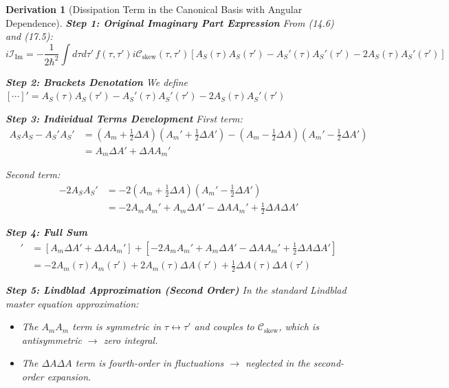 \documentclass[10pt, a4paper]{article}
\newtheorem{derivation}{Derivation}
\begin{document}
\begin{derivation}[Dissipation Term in the Canonical Basis with Angular Dependence]
\textbf{Step 1: Original Imaginary Part Expression}
From (14.6) and (17.5):
\begin{equation}
i\mathcal{I}_{\text{Im}} = -\frac{1}{2\hbar^2} \int d\tau d\tau' \, f(\tau,\tau') i\mathcal{C}_{\text{skew}}(\tau,\tau') \left[ A_S(\tau)A_S(\tau') - A_S'(\tau)A_S'(\tau') - 2A_S(\tau)A_S'(\tau') \right]
\tag{21.1}
\end{equation}

\textbf{Step 2: Brackets Denotation}
We define $[\cdots]' = A_S(\tau)A_S(\tau') - A_S'(\tau)A_S'(\tau') - 2A_S(\tau)A_S'(\tau')$

\textbf{Step 3: Individual Terms Development}
First term:
\begin{align}
A_SA_S - A_S'A_S' &= \left(A_m + \frac{1}{2}\Delta A\right)\left(A_m' + \frac{1}{2}\Delta A'\right) - \left(A_m - \frac{1}{2}\Delta A\right)\left(A_m' - \frac{1}{2}\Delta A'\right) \\
&= A_m\Delta A' + \Delta A A_m'
\tag{21.2}
\end{align}

Second term:
\begin{align}
-2A_SA_S' &= -2\left(A_m + \frac{1}{2}\Delta A\right)\left(A_m' - \frac{1}{2}\Delta A'\right) \\
&= -2A_mA_m' + A_m\Delta A' - \Delta A A_m' + \frac{1}{2}\Delta A\Delta A'
\tag{21.3}
\end{align}

\textbf{Step 4: Full Sum}
\begin{align}
[\cdots]' &= [A_m\Delta A' + \Delta A A_m'] + [-2A_mA_m' + A_m\Delta A' - \Delta A A_m' + \frac{1}{2}\Delta A\Delta A'] \\
&= -2A_m(\tau)A_m(\tau') + 2A_m(\tau)\Delta A(\tau') + \frac{1}{2}\Delta A(\tau)\Delta A(\tau')
\tag{21.4}
\end{align}

\textbf{Step 5: Lindblad Approximation (Second Order)}
In the standard Lindblad master equation approximation:
\begin{itemize}
\item The $A_mA_m$ term is symmetric in $\tau \leftrightarrow \tau'$ and couples to $\mathcal{C}_{\text{skew}}$, which is antisymmetric $\rightarrow$ zero integral.
\item The $\Delta A\Delta A$ term is fourth-order in fluctuations $\rightarrow$ neglected in the second-order expansion.
\end{itemize}


\end{derivation}
\end{document}
